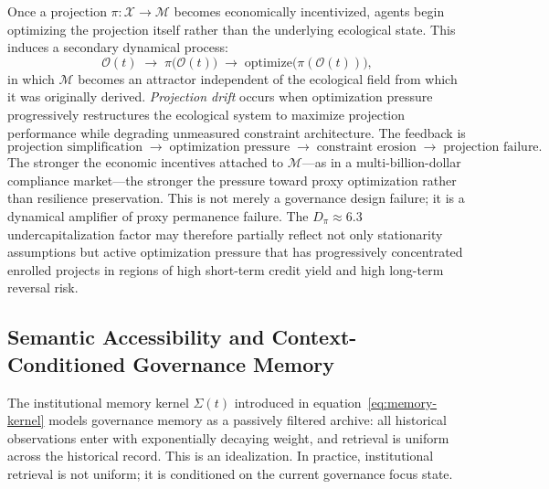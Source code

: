 \documentclass[12pt]{article}
\newcommand{\Xcal}{\mathcal{X}}
\newcommand{\Mcal}{\mathcal{M}}
\begin{document}
Once a projection $\pi:\Xcal\to\Mcal$ becomes economically incentivized, agents begin
optimizing the projection itself rather than the underlying ecological state. This
induces a secondary dynamical process:
\begin{equation}
\mathcal{O}(t)
\;\to\;
\pi\bigl(\mathcal{O}(t)\bigr)
\;\to\;
\mathrm{optimize}\bigl(\pi(\mathcal{O}(t))\bigr),
\end{equation}
in which $\Mcal$ becomes an attractor independent of the ecological field from which
it was originally derived. \emph{Projection drift} occurs when optimization pressure
progressively restructures the ecological system to maximize projection performance while
degrading unmeasured constraint architecture. The feedback is
\begin{equation}
\text{projection simplification}
\;\to\;
\text{optimization pressure}
\;\to\;
\text{constraint erosion}
\;\to\;
\text{projection failure}.
\end{equation}
The stronger the economic incentives attached to $\Mcal$---as in a multi-billion-dollar
compliance market---the stronger the pressure toward proxy optimization rather than
resilience preservation. This is not merely a governance design failure; it is a
dynamical amplifier of proxy permanence failure. The $D_\pi \approx 6.3$
undercapitalization factor \citep{Wu2026} may therefore partially reflect not only
stationarity assumptions but active optimization pressure that has progressively
concentrated enrolled projects in regions of high short-term credit yield and high
long-term reversal risk.

\subsection{Semantic Accessibility and Context-Conditioned Governance Memory}

The institutional memory kernel $\Sigma(t)$ introduced in equation~\eqref{eq:memory-kernel}
models governance memory as a passively filtered archive: all historical observations
enter with exponentially decaying weight, and retrieval is uniform across the historical
record. This is an idealization. In practice, institutional retrieval is not uniform;
it is conditioned on the current governance focus state.
\end{document}
